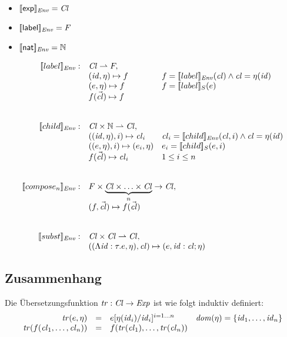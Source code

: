 \documentclass[12pt,a4paper]{article}
\begin{document}
\begin{itemize}
\item $[\![\mathsf{exp}]\!]_{\mathit{Env}} = \mathit{Cl}$
\item $[\![\mathsf{label}]\!]_{\mathit{Env}} = F$
\item $[\![\mathsf{nat}]\!]_{\mathit{Env}} = \mathbb N$
\end{itemize}

\[\begin{array}{rll}
  \sem{label}_\Env: & \Cl \pto F, \\
  & (\id,\eta) \mapsto f & f = \sem{label}_\Env(\cl) \wedge \cl = \eta(\id) \\
  & (e,\eta) \mapsto f & f = \sem{label}_S(e) \\
  & f(\vec{\cl}) \mapsto f \\
  \\\\
  \sem{child}_\Env: & \Cl \times \N \pto \Cl, \\
  & ((\id,\eta),i) \mapsto \cl_i & \cl_i = \sem{child}_\Env(\cl, i) \wedge \cl = \eta(\id) \\
  & ((e,\eta),i) \mapsto (e_i,\eta) & e_i = \sem{child}_S(e,i) \\
  & f(\vec{\cl}) \mapsto \cl_i & 1 \le i \le n \\
  \\\\
  \sem{compose_n}_\Env: & \multicolumn{2}{l}{F \times \underbrace{\Cl \times \ldots \times \Cl}_n \to \Cl,} \\
  & \multicolumn{2}{l}{(f,\vec{\cl}) \mapsto f(\vec{\cl})} \\
  \\\\
  \sem{subst}_\Env: & \multicolumn{2}{l}{\Cl \times \Cl \pto \Cl,} \\
  & \multicolumn{2}{l}{((\Lambda\id:\tau.e,\eta),\cl) \mapsto (e,\id:\cl;\eta)}
\end{array}\]


\subsection*{Zusammenhang}

Die \"Ubersetzungsfunktion $\mathit{tr}:\mathit{Cl}\to\mathit{Exp}$ ist wie folgt induktiv definiert:
\[\begin{array}{rcll}
  \mathit{tr}(e,\eta)
  &=& e[\eta(\mathit{id}_i)/\mathit{id}_i]^{i=1 \ldots n}
  & \mathit{dom}(\eta) = \{\mathit{id}_1,\ldots,\mathit{id}_n\}
  \\
  \mathit{tr}(f(\mathit{cl}_1,\ldots,\mathit{cl}_n))
  &=& f(\mathit{tr}(\mathit{cl}_1),\ldots,\mathit{tr}(\mathit{cl}_n))
\end{array}\]
\end{document}
